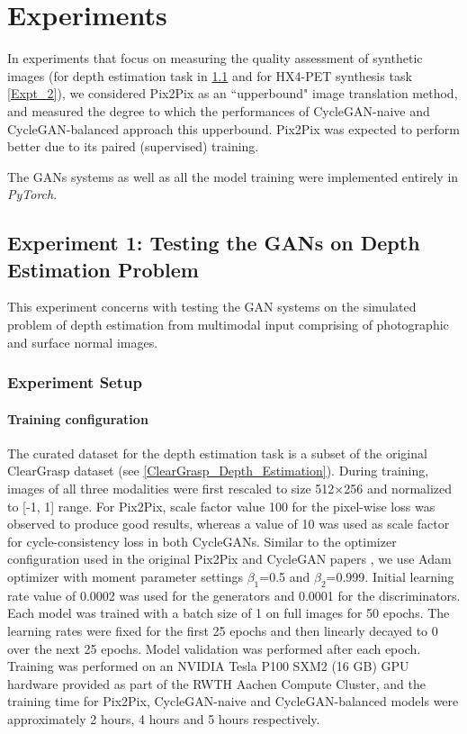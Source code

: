 \chapter{Experiments}
\label{Experiments}
In experiments that focus on measuring the quality assessment of synthetic images (for depth estimation task in \ref{Expt_1} and for HX4-PET synthesis task \ref{Expt_2}), we considered Pix2Pix as an ``upperbound" image translation method, and measured the degree to which the performances of CycleGAN-naive and CycleGAN-balanced approach this upperbound. Pix2Pix was expected to perform better due to its paired (supervised) training.

The GANs systems as well as all the model training were implemented entirely in \textit{PyTorch}.


\section{Experiment 1: Testing the GANs on Depth Estimation Problem}
\label{Expt_1}

This experiment concerns with testing the GAN systems on the simulated problem of depth estimation from multimodal input comprising of photographic and surface normal images.


\subsection{Experiment Setup}

\subsubsection{Training configuration}
The curated dataset for the depth estimation task is a subset of the original ClearGrasp dataset (see \ref{ClearGrasp_Depth_Estimation}). During training, images of all three modalities were first rescaled to size 512$\times$256 and normalized to [-1, 1] range.  For Pix2Pix, scale factor value 100 for the pixel-wise loss was observed to produce good results, whereas a value of 10 was used as scale factor for cycle-consistency loss in both CycleGANs. Similar to the optimizer configuration used in the original Pix2Pix and CycleGAN papers \cite{isola2017image, zhu2017unpaired}, we use Adam optimizer with moment parameter settings $\beta_1$=0.5 and $\beta_2$=0.999. Initial learning rate value of 0.0002 was used for the generators and 0.0001 for the discriminators. Each model was trained with a batch size of 1 on full images for 50 epochs. The learning rates were fixed for the first 25 epochs and then linearly decayed to 0 over the next 25 epochs. Model validation was performed after each epoch. Training was performed on an NVIDIA Tesla P100 SXM2 (16 GB) GPU hardware provided as part of the RWTH Aachen Compute Cluster, and the training time for Pix2Pix, CycleGAN-naive and CycleGAN-balanced models were approximately 2 hours, 4 hours and 5 hours respectively.

